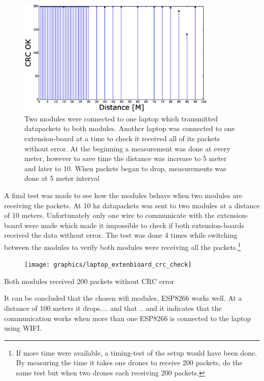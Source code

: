 \begin{figure}[H]
    \center
    \includegraphics[width=0.85\textwidth]{graphics/crc_distance_check.eps}
	\caption{Two modules were connected to one laptop which transmitted datapackets to both modules. Another laptop was connected to one extension-board at a time to check it received all of its packets without error. At the beginning a measurement was done at every meter, however to save time the distance was increase to 5 meter and later to 10. When packets began to drop, measurements was done at 5 meter interval}
    \label{fig:wifi_pingtest}
\end{figure}


A final test was made to see how the modules behave when two modules are receiving the packets. At 10 hz datapackets was sent to two modules at a distance of 10 meters.
Unfortunately only one wire to communicate with the extension-board were made which made it impossible to check if both extension-boards received the data without error. The test was done 4 times while switching between the modules to verify both modules were receiving all the packets.\footnote{If more time were available, a timing-test of the setup would have been done. By measuring the time it takes one drones to receive 200 packets, do the same test but when two drones each receiving 200 packets.}
\begin{figure}[H]
    \centering
        \texttt{[image: graphics/laptop\_extenbioard\_crc\_check]}
        \caption{}
        \label{fig:tiger}
\end{figure}
Both modules received 200 packets without CRC error 

It can be concluded that the chosen wifi modules, ESP8266 works well. At a distance of 100 meters it drops.... and that .. and it indicates that the communication works when more than one ESP8266 is connected to the laptop using WIFI.


